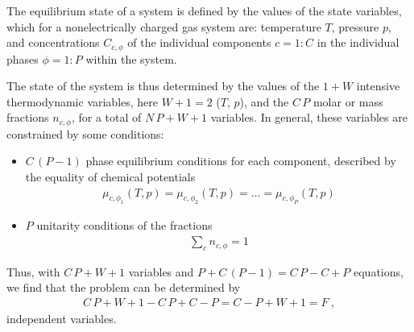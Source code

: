 \documentclass[letterpaper,10pt,english]{jupyterBook}
\begin{document}
\sphinxAtStartPar
The equilibrium state of a system is defined by the values of the state variables, which for a non\sphinxhyphen{}electrically charged gas system are: temperature \(T\), pressure \(p\), and concentrations \(C_{c,\phi}\) of the individual components \(c=1:C\) in the individual phases \(\phi = 1:P\) within the system.

\sphinxAtStartPar
The state of the system is thus determined by the values of the \(1+W\) intensive thermodynamic variables, here \(W+1=2\) (\(T\), \(p\)), and the \(C \, P\) molar or mass fractions \(n_{c,\phi}\), for a total of \(N \, P + W + 1\) variables.
In general, these variables are constrained by some conditions:
\begin{itemize}
\item {} 
\sphinxAtStartPar
\(C \, (P-1)\) phase equilibrium conditions for each component, described by the equality of chemical potentials
\begin{equation*}
\begin{split}\mu_{c,\phi_1}(T,p) = \mu_{c,\phi_2}(T,p) = \dots = \mu_{c,\phi_P}(T,p)\end{split}
\end{equation*}
\item {} 
\sphinxAtStartPar
\(P\) unitarity conditions of the fractions
\begin{equation*}
\begin{split}\sum_{c} n_{c,\phi} = 1\end{split}
\end{equation*}
\end{itemize}

\sphinxAtStartPar
Thus, with \(C \, P + W + 1\) variables and \(P + C\, (P-1) = C \, P - C + P\) equations, we find that the problem can be determined by
\begin{equation*}
\begin{split}C \, P + W + 1 - C \, P + C - P  =  C - P + W + 1 = F \ ,\end{split}
\end{equation*}
\sphinxAtStartPar
independent variables.
\end{document}
